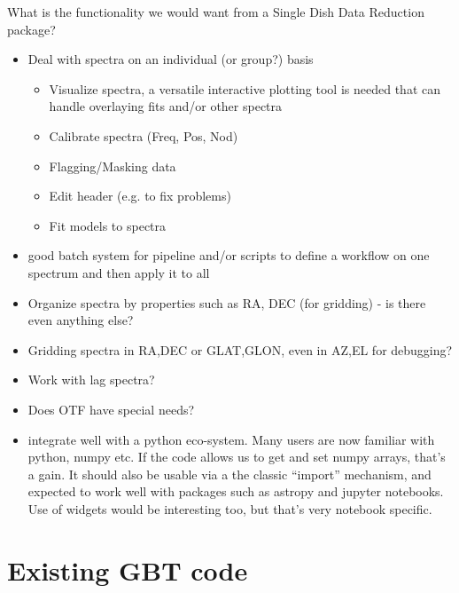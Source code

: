 \documentclass[12pt,a4paper]{article}
\begin{document}
What is the functionality we would want from a Single Dish Data Reduction
package? 

\begin{itemize}

\item Deal with spectra on an individual (or group?) basis
  \begin{itemize}
\item Visualize spectra, a versatile interactive plotting tool is needed
  that can handle overlaying fits and/or other spectra
\item Calibrate spectra (Freq, Pos, Nod)

\item Flagging/Masking data

\item Edit header (e.g. to fix problems)  

\item Fit models to spectra


  \end{itemize}


\item good batch system for pipeline and/or scripts to define a workflow on one spectrum
  and then apply it to all
  

  
\item Organize spectra by properties such as RA, DEC (for gridding) - is there even anything else?

\item Gridding spectra in RA,DEC or GLAT,GLON, even in AZ,EL for debugging?

\item Work with lag spectra?

\item Does OTF have special needs?

\item integrate well with a python eco-system. Many users are now familiar with
  python, numpy etc.  If the code allows us to get and set numpy arrays,
  that's a gain. It should also be usable via a the classic ``import''
  mechanism, and expected to work well with packages such as astropy and jupyter
  notebooks. Use of widgets would be interesting too, but that's very notebook
  specific.
\end{itemize}


\section{Existing GBT code}
\end{document}
